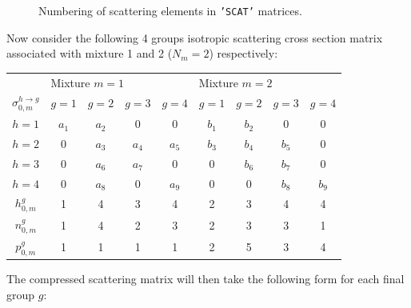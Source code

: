\begin{figure}[htbp] 
\begin{center} 
\epsfxsize=8cm
\centerline{ }
\parbox{14cm}{\caption{Numbering of scattering elements in {\tt 'SCAT'} matrices.}\label{fig:scat}} 
\end{center} 
\end{figure}

Now consider the following 4 groups isotropic scattering cross
section matrix associated with mixture 1 and 2 ($N_{m}=2$) respectively:

\begin{center}
\begin{tabular}{c||cccc|cccc}
                        &\multicolumn{4}{l|}{Mixture $m=1$}     &
                         \multicolumn{4}{l}{Mixture $m=2$}      \\
$\sigma_{0,m}^{h\to g}$ &$g=1$   & $g=2$   & $g=3$   & $g=4$    &    
                         $g=1$   & $g=2$   & $g=3$   & $g=4$    \\ \hline\hline
$h=1$                  & $a_{1}$ & $a_{2}$ & 0       & 0        &
                         $b_{1}$ & $b_{2}$ & 0       & 0        \\
$h=2$                  & 0       & $a_{3}$ & $a_{4}$ & $a_{5}$  &
                         $b_{3}$ & $b_{4}$ & $b_{5}$ & 0        \\
$h=3$                  & 0       & $a_{6}$ & $a_{7}$ & 0        &
                         0       & $b_{6}$ & $b_{7}$ & 0        \\
$h=4$                  & 0       & $a_{8}$ & 0       & $a_{9}$  &
                         0       & 0       & $b_{8}$ & $b_{9}$  \\ \hline\hline
$h_{0,m}^{g}$          & 1       & 4       & 3       & 4        &
                         2       & 3       & 4       & 4        \\
$n_{0,m}^{g}$          & 1       & 4       & 2       & 3        &
                         2       & 3       & 3       & 1        \\
$p_{0,m}^{g}$          & 1       & 1       & 1       & 1        &
                         2       & 5       & 3       & 4        \\
\end{tabular}
\end{center}

\noindent
The compressed scattering matrix will then take the following form for each final group $g$:

